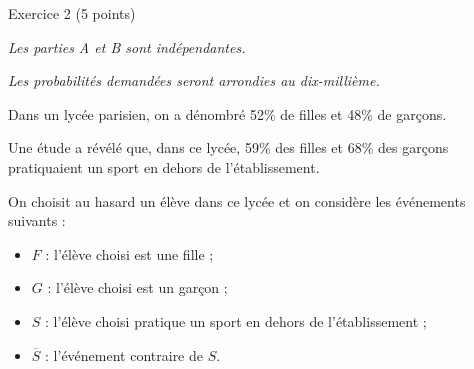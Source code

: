 
%
\begin{h2}Exercice 2 (5 points)\end{h2}
\par
\textit{Les parties A et B sont indépendantes.}
\par
\textit{Les probabilités demandées seront arrondies au dix-millième.}
\par
%
%
\par
Dans un lycée parisien, on a dénombré 52\% de filles et 48\% de garçons.
\par
Une étude a révélé que, dans ce lycée, 59\% des filles et 68\% des garçons pratiquaient un sport en dehors de l'établissement.
\par
On choisit au hasard un élève dans ce lycée et on considère les événements suivants :
\par
\begin{itemize}
     \item $F$ : \og l'élève choisi est une fille \fg{} ;
     \item $G$ : \og l'élève choisi est un garçon \fg{} ;
     \item $S$ : \og l'élève choisi pratique un sport en dehors de l'établissement\fg{} ;
     \item $\overline{S}$ : l'événement contraire de $S$.
\end{itemize}
\par

